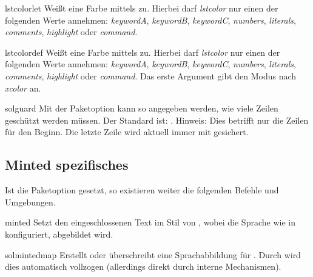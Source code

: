 \documentclass{sopra-base}
\begin{document}
\begin{command}{lstcolorlet}{}
    Weißt eine Farbe mittels  zu. Hierbei darf \emph{lstcolor} nur einen der folgenden Werte annehmen: \emph{keywordA}, \emph{keywordB}, \emph{keywordC}, \emph{numbers}, \emph{literals}, \emph{comments}, \emph{highlight} oder \emph{command}.
\end{command}

\begin{command}{lstcolordef}{}
    Weißt eine Farbe mittels  zu. Hierbei darf \emph{lstcolor} nur einen der folgenden Werte annehmen: \emph{keywordA}, \emph{keywordB}, \emph{keywordC}, \emph{numbers}, \emph{literals}, \emph{comments}, \emph{highlight} oder \emph{command}. Das erste Argument gibt den Modus nach \emph{xcolor} an.
\end{command}

\begin{command}{solguard}{}
    Mit der Paketoption  kann so angegeben werden, wie viele Zeilen geschützt werden müssen.
    Der Standard ist: \glqq{}{\makeatletter\@sol@guard@default}\grqq. Hinweis: Dies betrifft nur die Zeilen für den Beginn. Die letzte Zeile wird aktuell immer mit  gesichert.
\end{command}

\subsection{Minted spezifisches}

Ist die Paketoption  gesetzt, so existieren weiter die folgenden Befehle und Umgebungen.

\begin{environment}{minted}{}
    Setzt den eingeschlossenen Text im Stil von , wobei die Sprache wie in  konfiguriert, abgebildet wird.
\end{environment}

\begin{command}{solmintedmap}{}
    Erstellt oder überschreibt eine Sprachabbildung für .
    Durch  wird dies automatisch vollzogen (allerdings direkt durch interne Mechanismen).
\end{command}
\end{document}
